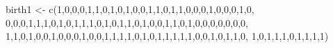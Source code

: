 \documentclass[
]{book}
\newenvironment{Shaded}{\begin{snugshade}}{\end{snugshade}}
\newcommand{\DecValTok}[1]{\textcolor[rgb]{0.00,0.00,0.81}{#1}}
\newcommand{\FunctionTok}[1]{\textcolor[rgb]{0.00,0.00,0.00}{#1}}
\newcommand{\NormalTok}[1]{#1}
\newcommand{\OtherTok}[1]{\textcolor[rgb]{0.56,0.35,0.01}{#1}}
\begin{document}
\begin{Shaded}
\begin{Highlighting}[]
\NormalTok{birth1 }\OtherTok{\textless{}{-}} \FunctionTok{c}\NormalTok{(}\DecValTok{1}\NormalTok{,}\DecValTok{0}\NormalTok{,}\DecValTok{0}\NormalTok{,}\DecValTok{0}\NormalTok{,}\DecValTok{1}\NormalTok{,}\DecValTok{1}\NormalTok{,}\DecValTok{0}\NormalTok{,}\DecValTok{1}\NormalTok{,}\DecValTok{0}\NormalTok{,}\DecValTok{1}\NormalTok{,}\DecValTok{0}\NormalTok{,}\DecValTok{0}\NormalTok{,}\DecValTok{1}\NormalTok{,}\DecValTok{1}\NormalTok{,}\DecValTok{0}\NormalTok{,}\DecValTok{1}\NormalTok{,}\DecValTok{1}\NormalTok{,}\DecValTok{0}\NormalTok{,}\DecValTok{0}\NormalTok{,}\DecValTok{0}\NormalTok{,}\DecValTok{1}\NormalTok{,}\DecValTok{0}\NormalTok{,}\DecValTok{0}\NormalTok{,}\DecValTok{0}\NormalTok{,}\DecValTok{1}\NormalTok{,}\DecValTok{0}\NormalTok{, }\DecValTok{0}\NormalTok{,}\DecValTok{0}\NormalTok{,}\DecValTok{0}\NormalTok{,}\DecValTok{1}\NormalTok{,}\DecValTok{1}\NormalTok{,}\DecValTok{1}\NormalTok{,}\DecValTok{0}\NormalTok{,}\DecValTok{1}\NormalTok{,}\DecValTok{0}\NormalTok{,}\DecValTok{1}\NormalTok{,}\DecValTok{1}\NormalTok{,}\DecValTok{1}\NormalTok{,}\DecValTok{0}\NormalTok{,}\DecValTok{1}\NormalTok{,}\DecValTok{0}\NormalTok{,}\DecValTok{1}\NormalTok{,}\DecValTok{1}\NormalTok{,}\DecValTok{0}\NormalTok{,}\DecValTok{1}\NormalTok{,}\DecValTok{0}\NormalTok{,}\DecValTok{0}\NormalTok{,}\DecValTok{1}\NormalTok{,}\DecValTok{1}\NormalTok{,}\DecValTok{0}\NormalTok{,}\DecValTok{1}\NormalTok{,}\DecValTok{0}\NormalTok{,}\DecValTok{0}\NormalTok{,}\DecValTok{0}\NormalTok{,}\DecValTok{0}\NormalTok{,}\DecValTok{0}\NormalTok{,}\DecValTok{0}\NormalTok{,}\DecValTok{0}\NormalTok{, }\DecValTok{1}\NormalTok{,}\DecValTok{1}\NormalTok{,}\DecValTok{0}\NormalTok{,}\DecValTok{1}\NormalTok{,}\DecValTok{0}\NormalTok{,}\DecValTok{0}\NormalTok{,}\DecValTok{1}\NormalTok{,}\DecValTok{0}\NormalTok{,}\DecValTok{0}\NormalTok{,}\DecValTok{0}\NormalTok{,}\DecValTok{1}\NormalTok{,}\DecValTok{0}\NormalTok{,}\DecValTok{0}\NormalTok{,}\DecValTok{1}\NormalTok{,}\DecValTok{1}\NormalTok{,}\DecValTok{1}\NormalTok{,}\DecValTok{1}\NormalTok{,}\DecValTok{0}\NormalTok{,}\DecValTok{1}\NormalTok{,}\DecValTok{0}\NormalTok{,}\DecValTok{1}\NormalTok{,}\DecValTok{1}\NormalTok{,}\DecValTok{1}\NormalTok{,}\DecValTok{1}\NormalTok{,}\DecValTok{1}\NormalTok{,}\DecValTok{0}\NormalTok{,}\DecValTok{0}\NormalTok{,}\DecValTok{1}\NormalTok{,}\DecValTok{0}\NormalTok{,}\DecValTok{1}\NormalTok{,}\DecValTok{1}\NormalTok{,}\DecValTok{0}\NormalTok{, }\DecValTok{1}\NormalTok{,}\DecValTok{0}\NormalTok{,}\DecValTok{1}\NormalTok{,}\DecValTok{1}\NormalTok{,}\DecValTok{1}\NormalTok{,}\DecValTok{0}\NormalTok{,}\DecValTok{1}\NormalTok{,}\DecValTok{1}\NormalTok{,}\DecValTok{1}\NormalTok{,}\DecValTok{1}\NormalTok{) }



\end{Highlighting}
\end{Shaded}
\end{document}
